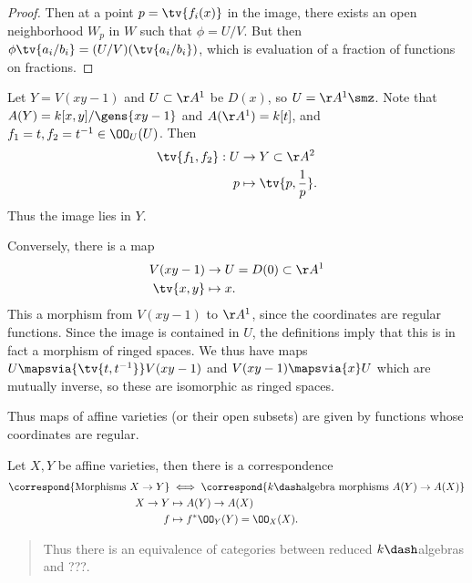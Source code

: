 \begin{proof}
Then at a point \(p = \tv{f_i(x)}\) in the image, there exists an open
neighborhood \(W_p\) in \(W\) such that \(\phi = U/V\). But then
\(\phi{\tv{a_i /b_i}} = (U/V)(\tv{a_i/b_i})\), which is evaluation of a
fraction of functions on fractions.

\end{proof}

\begin{example}

Let \(Y = V(xy-1)\) and \(U\subset \AA^1\) be \(D(x)\), so
\(U = \AA^1\smz\). Note that \(A(Y) = k[x,y]/\gens{xy-1}\) and
\(A(\AA^1) = k[t]\), and \(f_1=t, f_2=t^{-1} \in \OO_U(U)\). Then
\begin{align*}  
\tv{f_1, f_2}: U &\to Y\subset  \AA^2 \\
p &\mapsto \tv{p, {1\over p} }
.\end{align*} Thus the image lies in \(Y\).

Conversely, there is a map
\begin{align*}  
V(xy - 1) &\to U = D(0) \subset  \AA^1 \\
\tv{x, y} &\mapsto x
.\end{align*} This a morphism from \(V(xy - 1)\) to \(\AA^1\), since the
coordinates are regular functions. Since the image is contained in
\(U\), the definitions imply that this is in fact a morphism of ringed
spaces. We thus have maps \(U\mapsvia{\tv{t, t^{-1} }} V(xy-1)\) and
\(V(xy-1) \mapsvia{x} U\) which are mutually inverse, so these are
isomorphic as ringed spaces.

\end{example}

Thus maps of affine varieties (or their open subsets) are given by
functions whose coordinates are regular.

\begin{corollary}[?]

Let \(X, Y\) be affine varieties, then there is a correspondence
\begin{align*}  
\correspond{\text{Morphisms } X\to Y }
&\iff
\correspond{k\dash\text{algebra morphisms } A(Y) \to A(X)} \\
X\to Y &\mapsto A(Y) \to A(X) \\
f &\mapsto f^* \OO_Y(Y) = \OO_X(X)
.\end{align*}

\begin{quote}
Thus there is an equivalence of categories between reduced
\(k\dash\)algebras and ???.
\end{quote}

\end{corollary}

